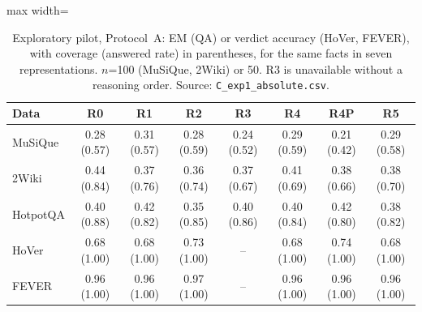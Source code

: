 \begin{table}[t]
\centering
\footnotesize
\begin{adjustbox}{max width=\linewidth}
\begin{tabular}{@{}lccccccc@{}}
\toprule
Data & R0 & R1 & R2 & R3 & R4 & R4P & R5 \\
\midrule
MuSiQue & 0.28 (0.57) & 0.31 (0.57) & 0.28 (0.59) & 0.24 (0.52) & 0.29 (0.59) & 0.21 (0.42) & 0.29 (0.58) \\
2Wiki & 0.44 (0.84) & 0.37 (0.76) & 0.36 (0.74) & 0.37 (0.67) & 0.41 (0.69) & 0.38 (0.66) & 0.38 (0.70) \\
HotpotQA & 0.40 (0.88) & 0.42 (0.82) & 0.35 (0.85) & 0.40 (0.86) & 0.40 (0.84) & 0.42 (0.80) & 0.38 (0.82) \\
HoVer & 0.68 (1.00) & 0.68 (1.00) & 0.73 (1.00) & -- & 0.68 (1.00) & 0.74 (1.00) & 0.68 (1.00) \\
FEVER & 0.96 (1.00) & 0.96 (1.00) & 0.97 (1.00) & -- & 0.96 (1.00) & 0.96 (1.00) & 0.96 (1.00) \\
\bottomrule
\end{tabular}
\end{adjustbox}
\caption{Exploratory pilot, Protocol~A: EM (QA) or verdict accuracy (HoVer, FEVER), with coverage (answered rate) in parentheses, for the same facts in seven representations. $n$=100 (MuSiQue, 2Wiki) or 50. R3 is unavailable without a reasoning order. Source: \texttt{C\_exp1\_absolute.csv}.}
\label{tab:absolute}
\end{table}
